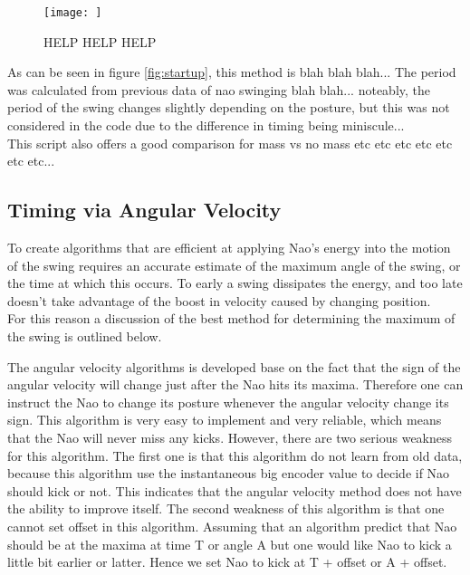 \documentclass[11pt]{article}
\newcommand*\ruleline[1]{\par\noindent\raisebox{.8ex}{\makebox[\linewidth]{\hrulefill\hspace{1ex}\raisebox{-.8ex}{#1}\hspace{1ex}\hrulefill}}}
\begin{document}
    
    \begin{figure}[!htb]
        \centering
        {\texttt{[image: ]}}
        \caption{HELP HELP HELP}
        \label{fig:test}
    \end{figure}


As can be seen in figure \ref{fig:startup}, this method is blah blah blah... The period was calculated from previous data of nao swinging blah blah... noteably, the period of the swing changes slightly depending on the posture, but this was not considered in the code due to the difference in timing being miniscule... \\

This script also offers a good comparison for mass vs no mass etc etc etc etc etc etc etc...



\subsection{Timing via Angular Velocity}
\ruleline{George Sheppard}
To create algorithms that are efficient at applying Nao's energy into the motion of the swing requires an accurate estimate of the maximum angle of the swing, or the time at which this occurs. To early a swing dissipates the energy, and too late doesn't take advantage of the boost in velocity caused by changing position.\\
For this reason a discussion of the best method for determining the maximum of the swing is outlined below.

\ruleline{Chenglong Li}
The angular velocity algorithms is developed base on the fact that the sign of the angular velocity will change just after the Nao hits its maxima. Therefore one can instruct the Nao to change its posture whenever the angular velocity change its sign. This algorithm is very easy to implement and very reliable, which means that the Nao will never miss any kicks. However, there are two serious weakness for this algorithm. The first one is that this algorithm do not learn from old data, because this algorithm use the instantaneous big encoder value to decide if Nao should kick or not. This indicates that the angular velocity method does not have the ability to improve itself. The second weakness of this algorithm is that one cannot set offset in this algorithm. Assuming that an algorithm predict that Nao should be at the maxima at time T or angle A but one would like Nao to kick a little bit earlier or latter. Hence we set Nao to kick at T + offset or A + offset.
\end{document}
